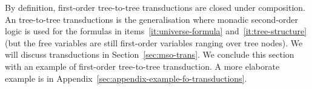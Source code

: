 By definition, first-order tree-to-tree transductions are closed under composition. An \mso tree-to-tree transductions is the generalisation where monadic second-order logic \mso is used for the formulas in items~\ref{it:universe-formula} and~\ref {it:tree-structure} (but the free variables are still first-order variables ranging over tree nodes). We will discuss \mso transductions in  Section~\ref{sec:mso-trans}.  We conclude this section with an example of first-order tree-to-tree transduction. A more elaborate example is in Appendix~\ref{sec:appendix-example-fo-transductions}.

    
    



